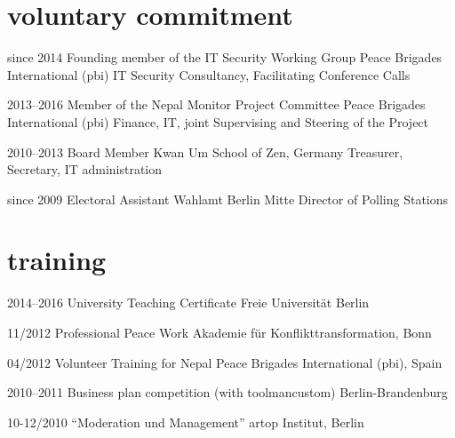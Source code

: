 \documentclass[]{friggeri-cv} %
\begin{document}
\section{voluntary commitment}

\begin{entrylist}

\entry
{since 2014}
{Founding member of the IT Security Working Group}
{Peace Brigades International (pbi)}
{IT Security Consultancy, Facilitating Conference Calls}

\entry
{2013--2016}
{Member of the Nepal Monitor Project Committee}
{Peace Brigades International (pbi)}
{Finance, IT, joint Supervising and Steering of the Project}

\entry
{2010--2013}
{Board Member}
{Kwan Um School of Zen, Germany}
{Treasurer, Secretary, IT administration}

\entry
{since 2009}
{Electoral Assistant}
{Wahlamt Berlin Mitte}
{Director of Polling Stations}

\end{entrylist}


\section{training }

\begin{entrylist}

\entry
{2014--2016}
{\normalfont University Teaching Certificate}
{Freie Universität Berlin}
{\vspace{-4mm}}


\entry
{11/2012}
{\normalfont Professional Peace Work}
{Akademie für Konflikttransformation, Bonn}
{\vspace{-4mm}}

\entry
{04/2012}
{\normalfont Volunteer Training for Nepal}
{Peace Brigades International (pbi), Spain}
{\vspace{-4mm}}

\entry
{2010--2011}
{\normalfont Business plan competition (with toolmancustom)}
{Berlin-Brandenburg}
{\vspace{-4mm}}

\entry
{10-12/2010}
{\normalfont ``Moderation und Management''}
{artop Institut, Berlin}
{\vspace{-4mm}}

\end{entrylist}
\end{document}
